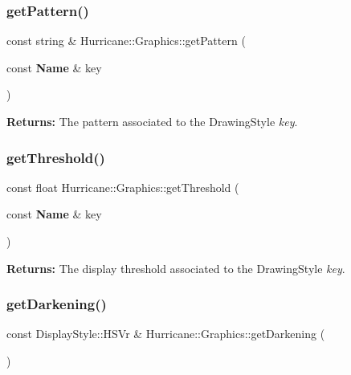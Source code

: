 \subsubsection{\texorpdfstring{get\+Pattern()}{getPattern()}}
{\footnotesize\ttfamily const string \& Hurricane\+::\+Graphics\+::get\+Pattern (\begin{DoxyParamCaption}\item[{const \textbf{ Name} \&}]{key }\end{DoxyParamCaption})\hspace{0.3cm}{\ttfamily [static]}}

{\bfseries Returns\+:} The pattern associated to the Drawing\+Style {\itshape key}. \mbox{\label{classHurricane_1_1Graphics_a2291edddc743edc44fdea26437f3095f}} 
\subsubsection{\texorpdfstring{get\+Threshold()}{getThreshold()}}
{\footnotesize\ttfamily const float Hurricane\+::\+Graphics\+::get\+Threshold (\begin{DoxyParamCaption}\item[{const \textbf{ Name} \&}]{key }\end{DoxyParamCaption})\hspace{0.3cm}{\ttfamily [static]}}

{\bfseries Returns\+:} The display threshold associated to the Drawing\+Style {\itshape key}. \mbox{\label{classHurricane_1_1Graphics_af34b6fe518ecb3f2959731f055ee27ff}} 
\subsubsection{\texorpdfstring{get\+Darkening()}{getDarkening()}}
{\footnotesize\ttfamily const Display\+Style\+::\+H\+S\+Vr \& Hurricane\+::\+Graphics\+::get\+Darkening (\begin{DoxyParamCaption}{ }\end{DoxyParamCaption})\hspace{0.3cm}{\ttfamily [static]}}

